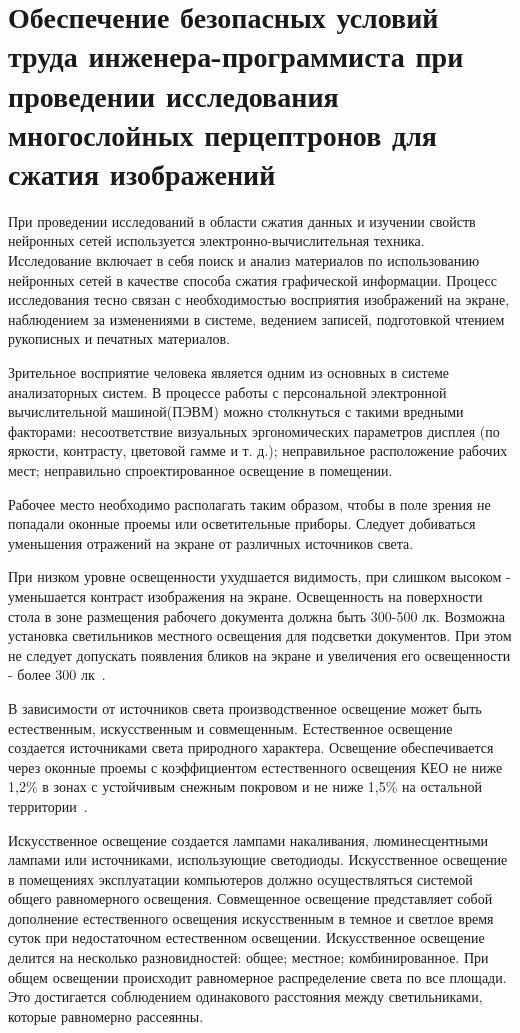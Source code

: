 \section{Обеспечение безопасных условий труда инженера-программиста при проведении исследования многослойных перцептронов для сжатия изображений}

При проведении исследований в области сжатия данных и изучении свойств нейронных сетей используется электронно-вычислительная техника.
Исследование включает в себя поиск и анализ материалов по использованию нейронных сетей в качестве способа сжатия графической информации.
Процесс исследования тесно связан с необходимостью восприятия изображений на экране, наблюдением за изменениями в системе, ведением записей, подготовкой чтением рукописных и печатных материалов.

Зрительное восприятие человека является одним из основных в системе анализаторных систем.
В процессе работы с персональной электронной вычислительной машиной(ПЭВМ) можно столкнуться с такими вредными факторами: несоответствие визуальных эргономических параметров дисплея (по яркости, контрасту, цветовой гамме и т. д.); неправильное расположение рабочих мест; неправильно спроектированное освещение в помещении.

Рабочее место необходимо располагать таким образом, чтобы в поле зрения не попадали оконные проемы или осветительные приборы. Следует добиваться уменьшения отражений на экране от различных источников света.

При низком уровне освещенности ухудшается видимость, при слишком высоком - уменьшается контраст изображения на экране.
Освещенность на поверхности стола в зоне размещения рабочего документа должна быть 300-500 лк.
Возможна установка светильников местного освещения для подсветки документов.
При этом не следует допускать появления бликов на экране и увеличения его освещенности - более 300 лк~\cite{ot_electric_lighting}.

В зависимости от источников света производственное освещение может быть естественным, искусственным и совмещенным.
Естественное освещение создается источниками света природного характера.
Освещение обеспечивается через оконные проемы с коэффициентом естественного освещения КЕО не ниже 1,2\% в зонах с устойчивым снежным покровом и не ниже 1,5\% на остальной территории~\cite{ot_electric_lighting}.

Искусственное освещение создается лампами накаливания, люминесцентными лампами или источниками, использующие светодиоды.
Искусственное освещение в помещениях эксплуатации компьютеров должно осуществляться системой общего равномерного освещения.
Совмещенное освещение представляет собой дополнение естественного освещения искусственным в темное и светлое время суток при недостаточном естественном освещении.
Искусственное освещение делится на несколько разновидностей: общее; местное; комбинированное.
При общем освещении происходит равномерное распределение света по все площади.
Это достигается соблюдением одинакового расстояния между светильниками, которые равномерно рассеянны.

